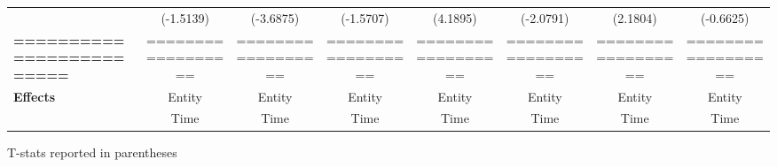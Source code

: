 \begin{center}
\begin{tabular}{lccccccc}
\textbf{ }                         &      (-1.5139)       &          (-3.6875)          &          (-1.5707)           &               (4.1895)              &            (-2.0791)             &           (2.1804)          &           (-0.6625)            \\
\textbf{=========================} &  ==================  &      ==================     &      ==================      &          ==================         &        ==================        &      ==================     &       ==================       \\
\textbf{Effects}                   &        Entity        &            Entity           &            Entity            &                Entity               &              Entity              &            Entity           &             Entity             \\
\textbf{}                          &         Time         &             Time            &             Time             &                 Time                &               Time               &             Time            &              Time              \\
\bottomrule
\end{tabular}
\end{center}

T-stats reported in parentheses